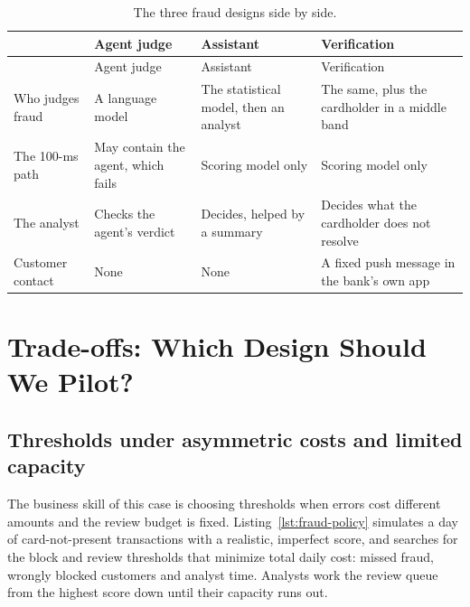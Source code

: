 \begingroup
\small
\begin{xltabular}{\textwidth}{@{}>{\raggedright\arraybackslash}p{2.7cm}>{\raggedright\arraybackslash}X>{\raggedright\arraybackslash}X>{\raggedright\arraybackslash}X@{}}
\caption{The three fraud designs side by side.}\label{tab:fr-designs}\\
\toprule
{} & Agent judge & Assistant & Verification \\
\midrule
\endfirsthead
\toprule
{} & Agent judge & Assistant & Verification \\
\midrule
\endhead
Who judges fraud & A language model & The statistical model, then an analyst & The same, plus the cardholder in a middle band \\
The 100-ms path & May contain the agent, which fails & Scoring model only & Scoring model only \\
The analyst & Checks the agent's verdict & Decides, helped by a summary & Decides what the cardholder does not resolve \\
Customer contact & None & None & A fixed push message in the bank's own app \\
\bottomrule
\end{xltabular}
\endgroup

\section{Trade-offs: Which Design Should We Pilot?}
\label{sec:fr-tradeoffs}

\subsection{Thresholds under asymmetric costs and limited capacity}

The business skill of this case is choosing thresholds when errors cost different amounts and the review budget is fixed. Listing~\ref{lst:fraud-policy} simulates a day of card-not-present transactions with a realistic, imperfect score, and searches for the block and review thresholds that minimize total daily cost: missed fraud, wrongly blocked customers and analyst time. Analysts work the review queue from the highest score down until their capacity runs out.




